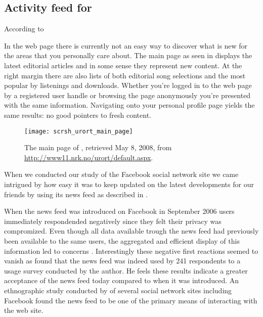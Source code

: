 \subsection{Activity feed for \urort{}}
\label{section:implementation.design.activity.feed}

According to 

In the \urort{} web page there is currently not an easy way to discover what
is new for the areas that you personally care about. The main page
as seen in 
displays the latest editorial articles and in some sense they represent
new content. At the right margin there are also lists of both editorial song
selections and the most popular by listenings and downloads. Whether you're
logged in to the web page by a registered user handle or browsing the page
anonymously you're presented with the same information. Navigating onto your
personal profile page yields the same results: no good pointers to fresh
content.

\begin{figure}
  \begin{whole}
    \texttt{[image: scrsh\_urort\_main\_page]}
    \caption[\urort{} Main Page]{
      The main page of \urort{},
      retrieved May 8, 2008, from
      \url{http://www11.nrk.no/urort/default.aspx}.
    }
    \label{figure:scrsh.urort.main.page}
  \end{whole}
\end{figure}

When we conducted our study of the Facebook social network site we came
intrigued by how easy it was to keep updated on the latest developments for
our friends by using its news feed as described in
. 

When the news feed was introduced on Facebook in September 2006 users
immediately respondended negatively since they felt their privacy was
compromized. Even though all data available trough the news feed had
previously been available to the same users, the aggregated and efficient
display of this information led to concerns \citet[]{boyd08}. 
Interestingly these negative first reactions seemed to vanish as
\citet[]{joinson08} found that the news feed was indeed used by
241 respondents to a usage survey conducted by the author. He feels these
results indicate a greater acceptance of the news feed today compared to when
it was introduced. An ethnographic study conducted by
\citet[]{chapman08} of several social network sites
including Facebook found the news feed to be one of the primary means of
interacting with the web site.

